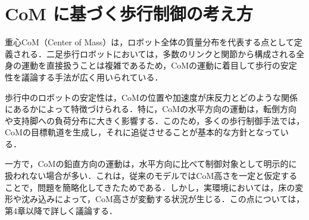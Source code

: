 \section{CoM に基づく歩行制御の考え方}

重心CoM（Center of Mass）は，ロボット全体の質量分布を代表する点として定義される．二足歩行ロボットにおいては，多数のリンクと関節から構成される全身の運動を直接扱うことは複雑であるため，CoMの運動に着目して歩行の安定性を議論する手法が広く用いられている．

歩行中のロボットの安定性は，CoMの位置や加速度が床反力とどのような関係にあるかによって特徴づけられる．特に，CoMの水平方向の運動は，転倒方向や支持脚への負荷分布に大きく影響する．このため，多くの歩行制御手法では，CoMの目標軌道を生成し，それに追従させることが基本的な方針となっている．

一方で，CoMの鉛直方向の運動は，水平方向に比べて制御対象として明示的に扱われない場合が多い．これは，従来のモデルではCoM高さを一定と仮定することで，問題を簡略化してきたためである．しかし，実環境においては，床の変形や沈み込みによって，CoM高さが変動する状況が生じる．この点については，第4章以降で詳しく議論する．